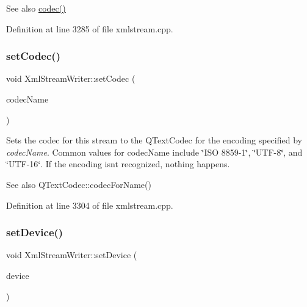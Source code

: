 \begin{DoxySeeAlso}{See also}
\hyperlink{class_xml_stream_writer_a08d4e9eddc07ed3682ced34cce8861f9}{codec()} 
\end{DoxySeeAlso}


Definition at line 3285 of file xmlstream.\+cpp.

\mbox{\label{class_xml_stream_writer_a926ebebdb26125f7423cf579bf07143a}} 
\subsubsection{\texorpdfstring{set\+Codec()}{setCodec()}\hspace{0.1cm}{\footnotesize\ttfamily [2/2]}}
{\footnotesize\ttfamily void Xml\+Stream\+Writer\+::set\+Codec (\begin{DoxyParamCaption}\item[{const char $\ast$}]{codec\+Name }\end{DoxyParamCaption})}

Sets the codec for this stream to the Q\+Text\+Codec for the encoding specified by {\itshape codec\+Name}. Common values for {\ttfamily codec\+Name} include \char`\"{}\+I\+S\+O 8859-\/1\char`\"{}, \char`\"{}\+U\+T\+F-\/8\char`\"{}, and \char`\"{}\+U\+T\+F-\/16\char`\"{}. If the encoding isn\textquotesingle{}t recognized, nothing happens.

\begin{DoxySeeAlso}{See also}
Q\+Text\+Codec\+::codec\+For\+Name() 
\end{DoxySeeAlso}


Definition at line 3304 of file xmlstream.\+cpp.

\mbox{\label{class_xml_stream_writer_ac03d4a48cc662d5c43a136560f514fd3}} 
\subsubsection{\texorpdfstring{set\+Device()}{setDevice()}}
{\footnotesize\ttfamily void Xml\+Stream\+Writer\+::set\+Device (\begin{DoxyParamCaption}\item[{Q\+I\+O\+Device $\ast$}]{device }\end{DoxyParamCaption})}

